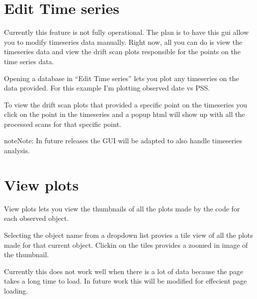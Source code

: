 \documentclass[letterpaper,10pt,english]{sphinxmanual}
\begin{document}
\noindent{}


\section{Edit Time series}
\label{\detokenize{extras/gui:edit-time-series}}
\sphinxAtStartPar
Currently this feature is not fully operational. The plan is to have this gui
allow you to modify timeseries data manually. Right now, all you can do is view
the timeseries data and view the drift scan plots responsible for the points
on the time series data.

\sphinxAtStartPar
Opening a database in “Edit Time series” lets you plot any timeseries on the data
provided. For this example I’m plotting observed date vs PSS.

\noindent{}

\sphinxAtStartPar
To view the drift scan plots that provided a specific point on the timeseries you
click on the point in the timeseries and a popup html will show up with all the
processed scans for that specific point.

\noindent{}

\begin{sphinxadmonition}{note}{Note:}
\sphinxAtStartPar
In future releases the GUI will be adapted to also handle timeseries analysis.
\end{sphinxadmonition}


\section{View plots}
\label{\detokenize{extras/gui:view-plots}}
\sphinxAtStartPar
View plots lets you view the thumbnails of all the plots made by the code for each
observed object.

\noindent{}

\sphinxAtStartPar
Selecting the object name from a dropdown list provies a tile view
of all the plots made for that current object. Clickin on the tiles
provides a zoomed in image of the thumbnail.

\noindent{}

\sphinxAtStartPar
Currently this does not work well when there is a lot of data
because the page takes a long time to load. In future work this will be modified
for effecient page loading.

\sphinxstepscope
\end{document}
